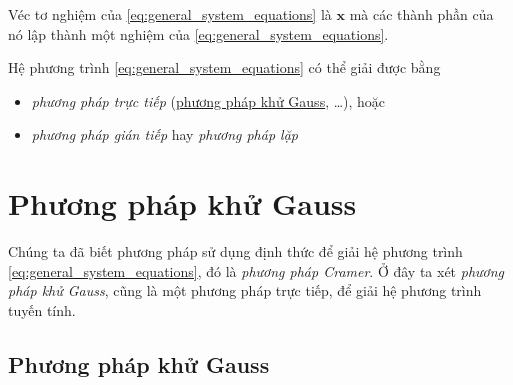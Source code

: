 \documentclass[../../Lectures]{subfiles}
\begin{document}
Véc tơ nghiệm của \eqref{eq:general_system_equations} là \(\bm{x}\) mà các thành
phần của nó lập thành một nghiệm của \eqref{eq:general_system_equations}.

Hệ phương trình \eqref{eq:general_system_equations} có thể giải được bằng
\begin{itemize}
    \item \emph{phương pháp trực tiếp}
        (\hyperref[method:gauss_elimination]{phương pháp khử Gauss}, \ldots),
        hoặc
    \item \emph{phương pháp gián tiếp} hay \emph{phương pháp lặp}
\end{itemize}



\section{Phương pháp khử Gauss}\label{sec:gauss_elimination}

Chúng ta đã biết phương pháp sử dụng định thức để giải hệ phương trình
\eqref{eq:general_system_equations}, đó là \emph{phương pháp Cramer}. Ở đây ta
xét \emph{phương pháp khử Gauss}, cũng là một phương pháp trực tiếp, để giải hệ
phương trình tuyến tính.

\subsection{Phương pháp khử Gauss}
\end{document}

